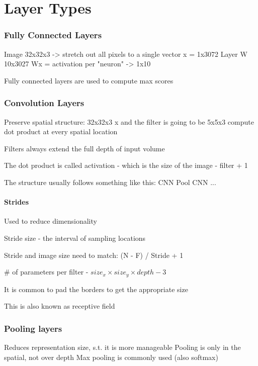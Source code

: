 \section{Layer Types}

\subsubsection{Fully Connected Layers}

Image 32x32x3 -> stretch out all pixels to a single vector x = 1x3072 
Layer W 10x3027
Wx = activation per "neuron" -> 1x10

Fully connected layers are used to compute max scores

\subsubsection{Convolution Layers}
Preserve spatial structure: 
32x32x3 x 
and the filter is going to be 5x5x3 
compute dot product at every spatial location

Filters always extend the full depth of input volume

The dot product is called activation - which is the size of the image - filter + 1

The structure usually follows something like this:
CNN
Pool
CNN
...

\paragraph{Strides}

Used to reduce dimensionality

Stride size - the interval of sampling locations

Stride and image size need to match: (N - F) / Stride + 1 

\# of parameters per filter - $size_x \times size_y \times depth - 3$

It is common to pad the borders to get the appropriate size

This is also known as receptive field

\subsubsection{Pooling layers}

Reduces representation size, s.t. it is more manageable 
Pooling is only in the spatial, not over depth
Max pooling is commonly used (also softmax)

